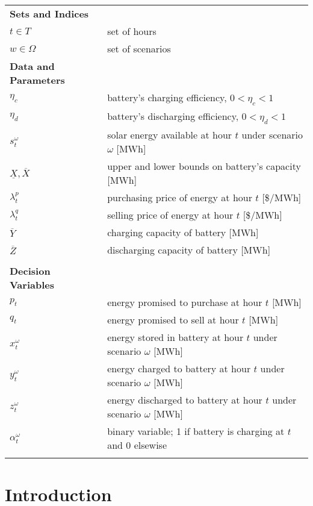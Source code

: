 \documentclass[opre,nonblindrev]{informs3} %
\begin{document}
			\begin{tabular}{l l}
				
				\bf {Sets and Indices} & \\
				$t \in T$ 		 & set of hours\\
				$w \in \Omega$ 		& set of scenarios \\

				\bf {Data and Parameters} & \\
				$\eta_c$ 		& battery's charging efficiency, $ 0 < \eta_c < 1 $   \\
				$\eta_d$ 		& battery's discharging efficiency, $ 0 < \eta_d < 1$   \\
				$s_t^\omega$ & solar energy available at hour $t$ under scenario $\omega$ [MWh]   \\ 
				$\underline{X}, \overline{X}$ 		& upper and lower bounds on battery's capacity [MWh]  \\ 
				$\lambda_t^p$ & purchasing price of energy at hour $t$ [\$/MWh] \\ 
				$\lambda_t^q$ & selling price of energy at hour $t$ [\$/MWh]\\ 
				$\overline{Y}$ 		& charging capacity of battery [MWh] \\
				$\overline{Z}$ 		& discharging capacity of battery  [MWh] \\ \\
				
				\bf {Decision Variables} & \\
				$p_t$ 		     		   & energy promised to purchase at hour $t$ [MWh]  \\
				$q_t$ 		     		   & energy promised to sell at hour $t$ [MWh]  \\
				$x_t^\omega$ 		 & energy stored in battery at hour $t$ under scenario $\omega$ [MWh]  \\
				$y_t^\omega$ 		 & energy charged to battery at hour $t$ under scenario $\omega$ [MWh]  \\
				$z_t^\omega$ 		 & energy discharged to battery at hour $t$ under scenario $\omega$ [MWh]  \\
				$\alpha_t^\omega$  & binary variable; 1 if battery is charging at $t$ and 0 elsewise \\	\\
		\end{tabular}
		\label{tab:notation}
	
	\section{Introduction}
	
\end{document}
